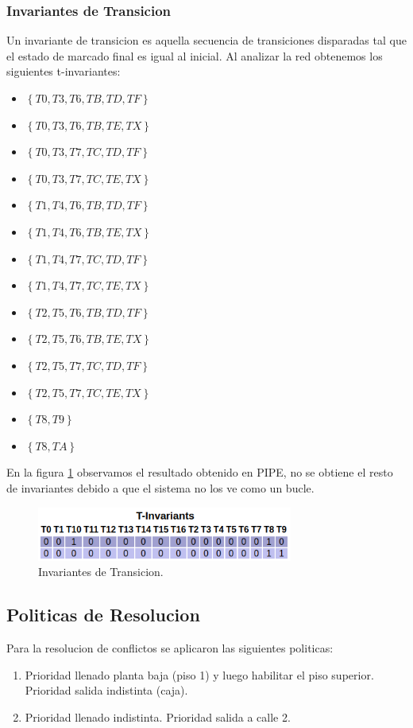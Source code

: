 \documentclass{article}
\begin{document}
		\subsubsection{Invariantes de Transicion}
		Un invariante de transicion es aquella secuencia de transiciones disparadas tal que el estado de marcado final es igual al inicial. Al analizar la red obtenemos los siguientes t-invariantes:
		\begin{itemize}
		\item $\left\lbrace T0,T3,T6,TB,TD,TF \right\rbrace$
		\item $\left\lbrace T0,T3,T6,TB,TE,TX \right\rbrace$
		\item $\left\lbrace T0,T3,T7,TC,TD,TF \right\rbrace$
		\item $\left\lbrace T0,T3,T7,TC,TE,TX \right\rbrace$
		\item $\left\lbrace T1,T4,T6,TB,TD,TF \right\rbrace$
		\item $\left\lbrace T1,T4,T6,TB,TE,TX \right\rbrace$
		\item $\left\lbrace T1,T4,T7,TC,TD,TF \right\rbrace$
		\item $\left\lbrace T1,T4,T7,TC,TE,TX \right\rbrace$
		\item $\left\lbrace T2,T5,T6,TB,TD,TF \right\rbrace$
		\item $\left\lbrace T2,T5,T6,TB,TE,TX \right\rbrace$
		\item $\left\lbrace T2,T5,T7,TC,TD,TF \right\rbrace$
		\item $\left\lbrace T2,T5,T7,TC,TE,TX \right\rbrace$
		\item $\left\lbrace T8,T9 \right\rbrace$
		\item $\left\lbrace T8,TA \right\rbrace$
		\end{itemize}
		En la figura \ref{fig:mesh7} observamos el resultado obtenido en PIPE, no se obtiene el resto de invariantes debido a que el sistema no los ve como un bucle.
		\begin{figure}[H]
			\centering
			\includegraphics[width=0.75\textwidth]{Invariantes_T_Tabla}
			\caption{Invariantes de Transicion.}
			\label{fig:mesh7}
		\end{figure} 
	\subsection{Politicas de Resolucion}
	Para la resolucion de conflictos se aplicaron las siguientes politicas:
	\begin{enumerate}
		\item Prioridad llenado planta baja (piso 1) y luego habilitar el piso
superior. Prioridad salida indistinta (caja).
		\item Prioridad llenado indistinta. Prioridad salida a calle 2.
	\end{enumerate}
\end{document}

